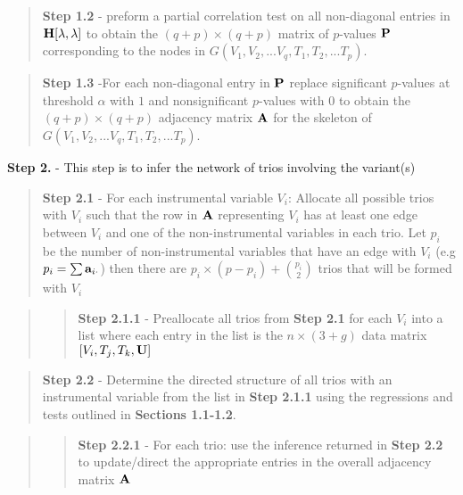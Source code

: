 \documentclass[12pt]{report}
\begin{document}
\begin{quote}
\textbf{Step 1.2} - preform a partial correlation test on all non-diagonal entries in ${\bf H}[\lambda, \lambda]$ to obtain the $(q+p) \times (q+p)$ matrix of $p$-values ${\bf P}$ corresponding to the nodes in  $G(V_1, V_2,...V_q, T_1, T_2, ... T_p)$. 
\end{quote}

\begin{quote}
\textbf{Step 1.3} -For each non-diagonal entry in $\bf P$ replace significant $p$-values at threshold $\alpha$ with $1$ and nonsignificant $p$-values with $0$ to obtain the $(q+p) \times (q+p)$ adjacency matrix $\bf A$ for the skeleton of $G(V_1, V_2,...V_q, T_1, T_2, ... T_p)$. \\
\end{quote}

\noindent \textbf{Step 2.} - This step is to infer the network of trios involving the variant(s) 

\begin{quote}
\textbf{Step 2.1} - For each instrumental variable $V_i$: Allocate all possible trios with $V_i$ such that the row in $\bf A$ representing $V_i$ has at least one edge between $V_i$ and one of the non-instrumental variables in each trio. Let $p_i$ be the number of non-instrumental variables that have an edge with $V_i$ (e.g $p_i = \sum {\bf a}_{i\cdot}$) then there are $p_i \times (p-p_i)+{p_i\choose2}$ trios that will be formed with $V_i$  \\
\end{quote}

\begin{quote}
\begin{quote}
\textbf{Step 2.1.1} -  Preallocate all trios from \textbf{Step 2.1} for each $V_i$ into a list where each entry in the list is the $n\times(3 +g)$ data matrix $[V_i,T_j,T_k, \bf{U}]$
\end{quote}
\end{quote}

\begin{quote}
\noindent \textbf{Step 2.2} - Determine the directed structure of all trios with an instrumental variable from the list in \textbf{Step 2.1.1} using the regressions and tests outlined in \textbf{Sections 1.1-1.2}. \\
\end{quote}

\begin{quote}
\begin{quote}
\textbf{Step 2.2.1} - For each trio: use the inference returned in \textbf{Step 2.2} to update/direct the appropriate entries in the overall adjacency matrix $\bf A$ 
\end{quote}
\end{quote}
\end{document}
